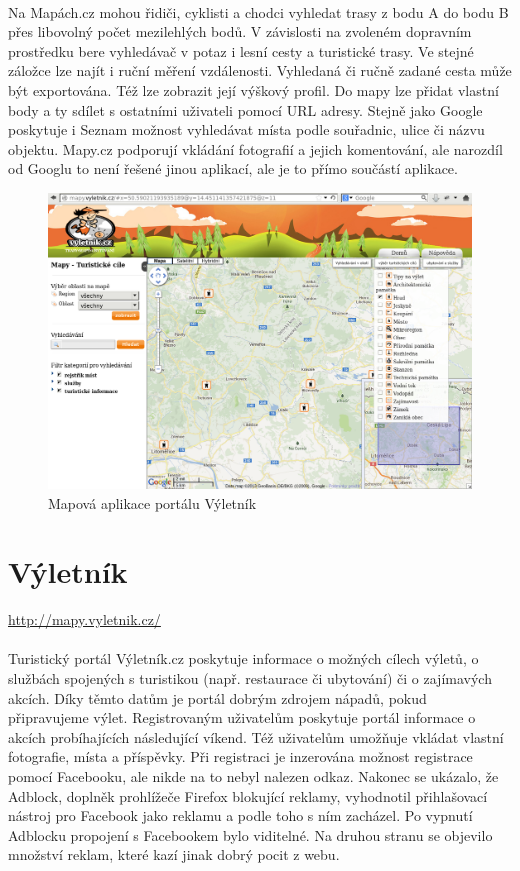 \documentclass[11pt,a4paper,titlepage,oneside]{book}
\begin{document}
		\paragraph{} Na Mapách.cz mohou řidiči, cyklisti a chodci vyhledat trasy z bodu A do bodu B přes libovolný počet mezilehlých bodů. V závislosti na zvoleném dopravním prostředku bere vyhledávač v potaz i lesní cesty a turistické trasy. Ve stejné záložce lze najít i ruční měření vzdálenosti. Vyhledaná či ručně zadané cesta může být exportována. Též lze zobrazit její výškový profil. Do mapy lze přidat vlastní body a ty sdílet s ostatními uživateli pomocí URL adresy. Stejně jako Google poskytuje i Seznam možnost vyhledávat místa podle souřadnic, ulice či názvu objektu. Mapy.cz podporují vkládání fotografií a jejich komentování, ale narozdíl od Googlu to není řešené jinou aplikací, ale je to přímo součástí aplikace.

		\begin{figure}[!h]
			\begin{center}
				\includegraphics[width=12cm]{obrazky/vyletnik.png}
				\caption{Mapová aplikace portálu Výletník}
			\end{center}
		\end{figure}

	\section{Výletník}
		\label{sec:vyletnik}
		\url{http://mapy.vyletnik.cz/}
		\paragraph{} Turistický portál Výletník.cz poskytuje informace o možných cílech výletů, o službách spojených s turistikou (např. restaurace či ubytování)  či o zají\-mavých akcích. Díky těmto datům je portál dobrým zdrojem nápadů, pokud připravujeme výlet. Registrovaným uživatelům poskytuje portál informace o akcích probíhajících následující víkend. Též uživatelům umožňuje vkládat vlastní fotografie, místa a příspěvky. Při registraci je inzerována možnost registrace pomocí Facebooku, ale nikde na to nebyl nalezen odkaz. Nakonec se ukázalo, že Adblock, doplněk prohlížeče Firefox blokující reklamy, vyhodnotil přihlašovací nástroj pro Facebook jako reklamu a podle toho s ním zacházel. Po vypnutí Adblocku propojení s Facebookem bylo viditelné. Na druhou stranu se objevilo množství reklam, které kazí jinak dobrý pocit z webu.
\end{document}
